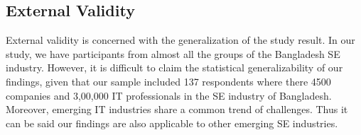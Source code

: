 \subsection{External Validity}
External validity is concerned with the generalization of the study result. In our study, we have participants from almost all the groups of the Bangladesh SE industry. However, it is difficult to claim the statistical generalizability of our findings, given that our sample included 137 respondents where there 4500 companies and 3,00,000 IT professionals\cite{BASIS2016} in the SE industry of Bangladesh. Moreover, emerging IT industries share a common trend of challenges\cite{Sison2006,lloyd2020}. Thus it can be said our findings are also applicable to other emerging SE industries.